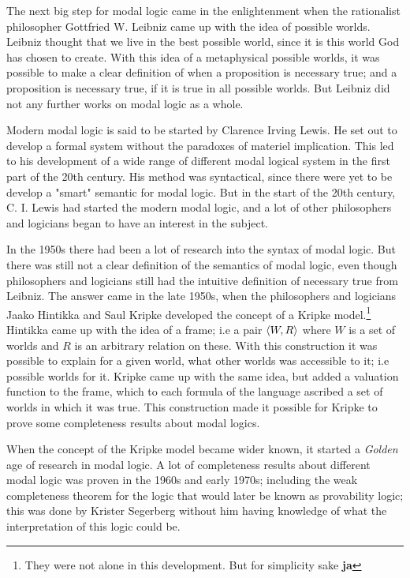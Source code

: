 \documentclass[../main.tex]{subfiles}
\begin{document}
The next big step for modal logic came in the enlightenment when the
rationalist philosopher Gottfried W. Leibniz came up with the idea of possible
worlds.  Leibniz thought that we live in the best possible world, since it is
this world God has chosen to create. With this idea of a metaphysical possible
worlds, it was possible to make a clear definition of when a proposition is
necessary true; and a proposition is necessary true, if it is true in all
possible worlds. But Leibniz did not any further works on modal logic as a
whole.

Modern modal logic is said to be started by Clarence Irving Lewis. He set out
to develop a formal system without the paradoxes of materiel
implication. This led to his development of a wide range of different modal
logical system in the first part of the 20th century. His method was
syntactical, since there were yet to be develop a "smart" semantic for modal
logic. But in the start of the 20th century, C. I. Lewis had started the modern
modal logic, and a lot of other philosophers and logicians began to have an
interest in the subject.


In the 1950s there had been a lot of research into the syntax of modal logic.
But there was still not a clear definition of the semantics of modal logic,
even though philosophers and logicians still had the intuitive definition of
necessary true from Leibniz. The answer came in the late 1950s, when the
philosophers and logicians Jaako Hintikka
and Saul Kripke developed the concept of a Kripke model.\footnote{They were not
	alone in this development. But for simplicity sake \textbf{ja}}
Hintikka came up with the idea of a frame; i.e a pair $\langle W,R\rangle$ where $W$ is
a set of worlds and $R$ is an arbitrary relation on these. With this
construction it was possible to explain for a given world, what other worlds
was accessible to it; i.e possible worlds for it. Kripke came up with the same
idea, but added a valuation function to the frame, which to each formula of the
language ascribed a set of worlds in which it was true.  This construction made
it possible for Kripke to prove some completeness results about modal logics.

When the concept of the Kripke model became wider known, it started a
\textit{Golden} age of research in modal logic. A lot of completeness results
about different modal logic was proven in the 1960s and early 1970s; including
the weak completeness theorem for the logic that would later be known as
provability logic; this was done by Krister Segerberg without him having
knowledge of what the interpretation of this logic could be.
\end{document}
